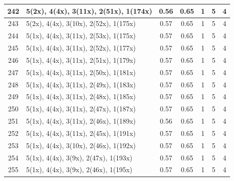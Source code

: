 \begin{small}
\begin{longtable}{|c|p{4cm}|c|c|c|c|c|}
  242 & 5(2x), 4(4x), 3(11x), 2(51x), 1(174x) & \cellcolor{colorOK}  0.56 & \cellcolor{colorOK} 0.65 & 1 & 5 & \cellcolor{colorGood} 4 \\   \hline
  243 & 5(2x), 4(4x), 3(10x), 2(52x), 1(175x) & \cellcolor{colorOK}  0.57 & \cellcolor{colorOK} 0.65 & 1 & 5 & \cellcolor{colorGood} 4 \\   \hline
  244 & 5(1x), 4(4x), 3(11x), 2(53x), 1(175x) & \cellcolor{colorOK}  0.57 & \cellcolor{colorOK} 0.65 & 1 & 5 & \cellcolor{colorGood} 4 \\   \hline
  245 & 5(1x), 4(4x), 3(11x), 2(52x), 1(177x) & \cellcolor{colorOK}  0.57 & \cellcolor{colorOK} 0.65 & 1 & 5 & \cellcolor{colorGood} 4 \\   \hline
  246 & 5(1x), 4(4x), 3(11x), 2(51x), 1(179x) & \cellcolor{colorOK}  0.57 & \cellcolor{colorOK} 0.65 & 1 & 5 & \cellcolor{colorGood} 4 \\   \hline
  247 & 5(1x), 4(4x), 3(11x), 2(50x), 1(181x) & \cellcolor{colorOK}  0.57 & \cellcolor{colorOK} 0.65 & 1 & 5 & \cellcolor{colorGood} 4 \\   \hline
  248 & 5(1x), 4(4x), 3(11x), 2(49x), 1(183x) & \cellcolor{colorOK}  0.57 & \cellcolor{colorOK} 0.65 & 1 & 5 & \cellcolor{colorGood} 4 \\   \hline
  249 & 5(1x), 4(4x), 3(11x), 2(48x), 1(185x) & \cellcolor{colorOK}  0.57 & \cellcolor{colorOK} 0.65 & 1 & 5 & \cellcolor{colorGood} 4 \\   \hline
  250 & 5(1x), 4(4x), 3(11x), 2(47x), 1(187x) & \cellcolor{colorOK}  0.57 & \cellcolor{colorOK} 0.65 & 1 & 5 & \cellcolor{colorGood} 4 \\   \hline
  251 & 5(1x), 4(4x), 3(11x), 2(46x), 1(189x) & \cellcolor{colorOK}  0.56 & \cellcolor{colorOK} 0.65 & 1 & 5 & \cellcolor{colorGood} 4 \\   \hline
  252 & 5(1x), 4(4x), 3(11x), 2(45x), 1(191x) & \cellcolor{colorOK}  0.57 & \cellcolor{colorOK} 0.65 & 1 & 5 & \cellcolor{colorGood} 4 \\   \hline
  253 & 5(1x), 4(4x), 3(10x), 2(46x), 1(192x) & \cellcolor{colorOK}  0.57 & \cellcolor{colorOK} 0.65 & 1 & 5 & \cellcolor{colorGood} 4 \\   \hline
  254 & 5(1x), 4(4x), 3(9x), 2(47x), 1(193x) & \cellcolor{colorOK}  0.57 & \cellcolor{colorOK} 0.65 & 1 & 5 & \cellcolor{colorGood} 4 \\   \hline
  255 & 5(1x), 4(4x), 3(9x), 2(46x), 1(195x) & \cellcolor{colorOK}  0.57 & \cellcolor{colorOK} 0.65 & 1 & 5 & \cellcolor{colorGood} 4 \\   \hline

\end{longtable}
\end{small}
